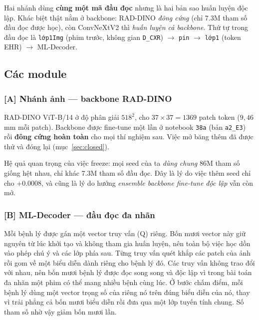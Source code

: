 \documentclass[11pt,a4paper]{article}
\newcommand{\code}[1]{\texttt{\small #1}}
\begin{document}
\begin{center}
\end{center}

\noindent Hai nhánh dùng \textbf{cùng một mã đầu đọc} nhưng là hai bản sao huấn luyện độc
lập. Khác biệt thật nằm ở backbone: RAD-DINO \emph{đông cứng} (chỉ 7.3M tham số đầu đọc
được học), còn ConvNeXtV2 thì \emph{huấn luyện cả backbone}. Thứ tự trong đầu đọc là
\code{lớp1Img} (phim trước, không gian \code{D\_CXR}) $\to$ \code{pin} $\to$ \code{lớp1}
(token EHR) $\to$ ML-Decoder.

\subsection{Các module}

\subsubsection*{[A] Nhánh ảnh --- backbone RAD-DINO}

RAD-DINO ViT-B/14 ở độ phân giải $518^2$, cho $37\times37 = 1369$ patch token
($9{,}46$ mm mỗi patch). Backbone được fine-tune một lần ở notebook \code{38a}
(bản \code{a2\_E3}) rồi \textbf{đông cứng hoàn toàn} cho mọi thí nghiệm sau. Việc mở
băng thêm đã được thử và đóng lại (mục~\ref{sec:closed}).

Hệ quả quan trọng của việc freeze: mọi seed của ta \emph{dùng chung} 86M tham số
giống hệt nhau, chỉ khác 7.3M tham số đầu đọc. Đây là lý do việc thêm seed chỉ cho
$+0.0008$, và cũng là lý do hướng \emph{ensemble backbone fine-tune độc lập} vẫn còn mở.

\subsubsection*{[B] ML-Decoder --- đầu đọc đa nhãn}

Mỗi bệnh lý được gán một vector truy vấn (Q) riêng. Bốn mươi vector này giữ nguyên từ lúc
khởi tạo và không tham gia huấn luyện, nên toàn bộ việc học dồn vào phép chú ý và các
lớp phía sau.
Từng truy vấn quét khắp các patch của ảnh rồi gom về một biểu diễn dành riêng cho bệnh
lý đó. Các truy vấn không trao đổi với nhau, nên bốn mươi bệnh lý được đọc song song và
độc lập vì trong bài toán đa nhãn một phim có thể mang nhiều bệnh cùng lúc.
Ở bước chấm điểm, mỗi bệnh lý dùng một vector trọng số của riêng nó trên đúng biểu diễn
của nó, thay vì trải phẳng cả bốn mươi biểu diễn rồi đưa qua một lớp tuyến tính chung.
Số tham số nhờ vậy giảm bốn mươi lần.
\end{document}
